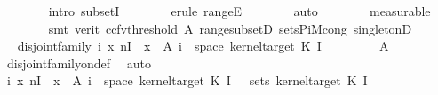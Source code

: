 \begin{isabellebody}
\ \ \ \ \ \ \isamarkupfalse%
\ {\isacharparenleft}{\kern0pt}intro\ subsetI{\isacharparenright}{\kern0pt}\isanewline
\ \ \ \ \ \ \isamarkupfalse%
\ {\isacharparenleft}{\kern0pt}erule\ rangeE{\isacharparenright}{\kern0pt}\isanewline
\ \ \ \ \ \ \isamarkupfalse%
\ auto\isanewline
\ \ \ \ \ \ \isamarkupfalse%
\ measurable\isanewline
\ \ \ \ \ \ \isamarkupfalse%
\ {\isacharparenleft}{\kern0pt}smt\ {\isacharparenleft}{\kern0pt}verit{\isacharcomma}{\kern0pt}\ ccfv{\isacharunderscore}{\kern0pt}threshold{\isacharparenright}{\kern0pt}\ A{\isacharparenleft}{\kern0pt}{}{\isacharparenright}{\kern0pt}\ range{\isacharunderscore}{\kern0pt}subsetD\ sets{\isacharunderscore}{\kern0pt}PiM{\isacharunderscore}{\kern0pt}cong\ singletonD{\isacharparenright}{\kern0pt}\isanewline
\ \ \ \ \isamarkupfalse%
\ \isamarkupfalse%
\ {\isachardoublequoteopen}disjoint{\isacharunderscore}{\kern0pt}family\ {\isacharparenleft}{\kern0pt}{\isasymlambda}i{\isachardot}{\kern0pt}\ {\isacharparenleft}{\kern0pt}{\isasymlambda}x{\isachardot}{\kern0pt}\ {\isasymlambda}n{\isasymin}{\isacharbraceleft}{\kern0pt}I\ {}{\isacharbraceright}{\kern0pt}{\isachardot}{\kern0pt}\ x{\isacharparenright}{\kern0pt}\ {\isacharminus}{\kern0pt}{\isacharbackquote}{\kern0pt}\ A\ i\ {\isasyminter}\ space\ {\isacharparenleft}{\kern0pt}kernel{\isacharunderscore}{\kern0pt}target\ {\isacharparenleft}{\kern0pt}K\ {\isacharparenleft}{\kern0pt}I\ {}{\isacharparenright}{\kern0pt}{\isacharparenright}{\kern0pt}{\isacharparenright}{\kern0pt}{\isacharparenright}{\kern0pt}{\isachardoublequoteclose}\isanewline
\ \ \ \ \ \ \isamarkupfalse%
\ A{\isacharparenleft}{\kern0pt}{}{\isacharparenright}{\kern0pt}\ \isamarkupfalse%
\ disjoint{\isacharunderscore}{\kern0pt}family{\isacharunderscore}{\kern0pt}on{\isacharunderscore}{\kern0pt}def\ \isamarkupfalse%
\ auto\isanewline
\ \ \ \ \isamarkupfalse%
\ \isamarkupfalse%
\ {\isachardoublequoteopen}{\isacharparenleft}{\kern0pt}{\isasymUnion}i{\isachardot}{\kern0pt}\ {\isacharparenleft}{\kern0pt}{\isasymlambda}x{\isachardot}{\kern0pt}\ {\isasymlambda}n{\isasymin}{\isacharbraceleft}{\kern0pt}I\ {}{\isacharbraceright}{\kern0pt}{\isachardot}{\kern0pt}\ x{\isacharparenright}{\kern0pt}\ {\isacharminus}{\kern0pt}{\isacharbackquote}{\kern0pt}\ A\ i\ {\isasyminter}\ space\ {\isacharparenleft}{\kern0pt}kernel{\isacharunderscore}{\kern0pt}target\ {\isacharparenleft}{\kern0pt}K\ {\isacharparenleft}{\kern0pt}I\ {}{\isacharparenright}{\kern0pt}{\isacharparenright}{\kern0pt}{\isacharparenright}{\kern0pt}{\isacharparenright}{\kern0pt}\ {\isasymin}\ sets\ {\isacharparenleft}{\kern0pt}kernel{\isacharunderscore}{\kern0pt}target\ {\isacharparenleft}{\kern0pt}K\ {\isacharparenleft}{\kern0pt}I\ {}{\isacharparenright}{\kern0pt}{\isacharparenright}{\kern0pt}{\isacharparenright}{\kern0pt}{\isachardoublequoteclose}\isanewline

\end{isabellebody}
